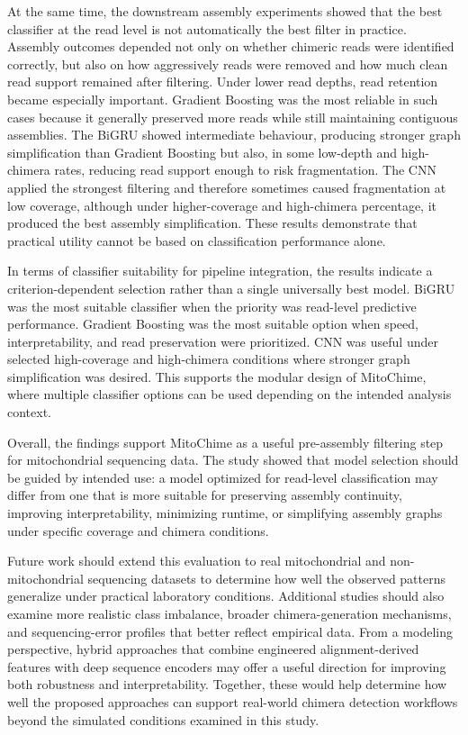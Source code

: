 At the same time, the downstream assembly experiments showed that the best classifier at the read level is not automatically the best filter in practice. Assembly outcomes depended not only on whether chimeric reads were identified correctly, but also on how aggressively reads were removed and how much clean read support remained after filtering. Under lower read depths, read retention became especially important. Gradient Boosting was the most reliable in such cases because it generally preserved more reads while still maintaining contiguous assemblies. The BiGRU showed intermediate behaviour, producing stronger graph simplification than Gradient Boosting but also, in some low-depth and high-chimera rates, reducing read support enough to risk fragmentation. The CNN applied the strongest filtering and therefore sometimes caused fragmentation at low coverage, although under higher-coverage and high-chimera percentage, it produced the best assembly simplification. These results demonstrate that practical utility cannot be based on classification performance alone.

In terms of classifier suitability for pipeline integration, the results indicate a criterion-dependent selection rather than a single universally best model. BiGRU was the most suitable classifier when the priority was read-level predictive performance. Gradient Boosting was the most suitable option when speed, interpretability, and read preservation were prioritized. CNN was useful under selected high-coverage and high-chimera conditions where stronger graph simplification was desired. This supports the modular design of MitoChime, where multiple classifier options can be used depending on the intended analysis context.

Overall, the findings support MitoChime as a useful pre-assembly filtering step for mitochondrial sequencing data. The study showed that model selection should be guided by intended use: a model optimized for read-level classification may differ from one that is more suitable for preserving assembly continuity, improving interpretability, minimizing runtime, or simplifying assembly graphs under specific coverage and chimera conditions.

Future work should extend this evaluation to real mitochondrial and non-mitochondrial sequencing datasets to determine how well the observed patterns generalize under practical laboratory conditions. Additional studies should also examine more realistic class imbalance, broader chimera-generation mechanisms, and sequencing-error profiles that better reflect empirical data. From a modeling perspective, hybrid approaches that combine engineered alignment-derived features with deep sequence encoders may offer a useful direction for improving both robustness and interpretability. Together, these would help determine how well the proposed approaches can support real-world chimera detection workflows beyond the simulated conditions examined in this study.